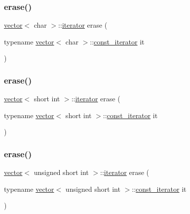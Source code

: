 \mbox{\label{classvector_ae0b9828d9c4aeb83ed094372bcdcccd7}} 
\subsubsection{\texorpdfstring{erase()}{erase()}\hspace{0.1cm}{\footnotesize\ttfamily [6/28]}}
{\footnotesize\ttfamily \mbox{\hyperlink{classvector}{vector}}$<$ char $>$\+::\mbox{\hyperlink{classvector_a35c955cacac6aacaa1e82874b1628865}{iterator}} erase (\begin{DoxyParamCaption}\item[{typename \mbox{\hyperlink{classvector}{vector}}$<$ char $>$\+::\mbox{\hyperlink{classvector_a2fc97dce62b7053449cc868607540dba}{const\+\_\+iterator}}}]{it }\end{DoxyParamCaption})}

\mbox{\label{classvector_a7eeef8d4a0151bdd583e95fe2ccfe40d}} 
\subsubsection{\texorpdfstring{erase()}{erase()}\hspace{0.1cm}{\footnotesize\ttfamily [7/28]}}
{\footnotesize\ttfamily \mbox{\hyperlink{classvector}{vector}}$<$ short int $>$\+::\mbox{\hyperlink{classvector_a35c955cacac6aacaa1e82874b1628865}{iterator}} erase (\begin{DoxyParamCaption}\item[{typename \mbox{\hyperlink{classvector}{vector}}$<$ short int $>$\+::\mbox{\hyperlink{classvector_a2fc97dce62b7053449cc868607540dba}{const\+\_\+iterator}}}]{it }\end{DoxyParamCaption})}

\mbox{\label{classvector_a950d1cc93ba543ed6a8e198b9f4cef9c}} 
\subsubsection{\texorpdfstring{erase()}{erase()}\hspace{0.1cm}{\footnotesize\ttfamily [8/28]}}
{\footnotesize\ttfamily \mbox{\hyperlink{classvector}{vector}}$<$ unsigned short int $>$\+::\mbox{\hyperlink{classvector_a35c955cacac6aacaa1e82874b1628865}{iterator}} erase (\begin{DoxyParamCaption}\item[{typename \mbox{\hyperlink{classvector}{vector}}$<$ unsigned short int $>$\+::\mbox{\hyperlink{classvector_a2fc97dce62b7053449cc868607540dba}{const\+\_\+iterator}}}]{it }\end{DoxyParamCaption})}

